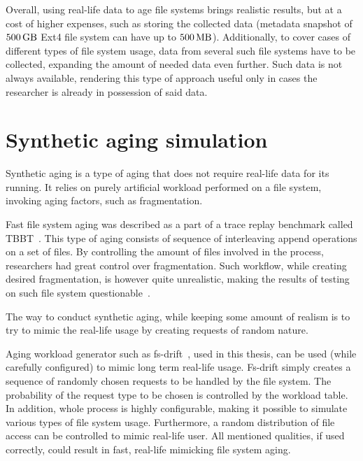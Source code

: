 \documentclass[
  color, %
  table, %
  lof,   %
  lot,   %
]{fithesis3}
\begin{document}
Overall, using real-life data to age file systems brings realistic results, but at a cost of higher expenses, such as storing the collected data (metadata snapshot of $\SI{500}{\giga\byte}$ Ext4 file system can have up to $\SI{500}{\mega\byte}$). Additionally, to cover cases of different types of file system usage, data from several such file systems have to be collected, expanding the amount of needed data even further. Such data is not always available, rendering this type of approach useful only in cases the researcher is already in possession of said data.

\section{Synthetic aging simulation}
Synthetic aging is a type of aging that does not require real-life data for its running. It relies on purely artificial workload performed on a file system, invoking aging factors, such as fragmentation.

Fast file system aging was described as a part of a trace replay benchmark called TBBT~\cite{Zhu:2005:TSA:1251028.1251052}. This type of aging consists of sequence of interleaving append operations on a set of files. By controlling the amount of files involved in the process, researchers had great control over fragmentation. Such workflow, while creating desired fragmentation, is however quite unrealistic, making the results of testing on such file system questionable~\cite{Traeger:2008:NYS:1367829.1367831}.

The way to conduct synthetic aging, while keeping some amount of realism is to try to mimic the real-life usage by creating requests of random nature. 

Aging workload generator such as fs-drift~\cite{fs-drift:github}, used in this thesis, can be used (while carefully configured) to mimic long term real-life usage. Fs-drift simply creates a sequence of randomly chosen requests to be handled by the file system. The probability of the request type to be chosen is controlled by the workload table. In addition, whole process is highly configurable, making it possible to simulate various types of file system usage. Furthermore, a random distribution of file access can be controlled to mimic real-life user. All mentioned qualities, if used correctly, could result in fast, real-life mimicking file system aging.
\end{document}
